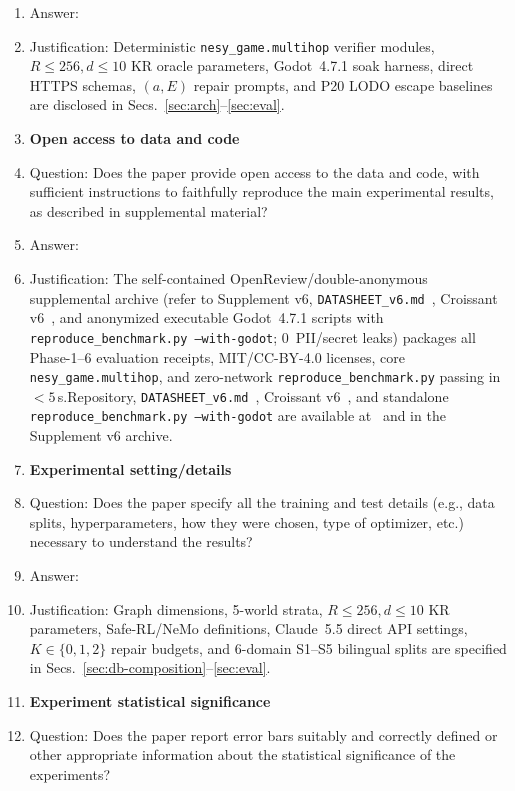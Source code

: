 \documentclass{article}
\begin{document}
\begin{enumerate}
    \item[] Answer: \answerYes{}
    \item[] Justification: Deterministic \texttt{nesy\_game.multihop} verifier modules, $R{\le}256, d{\le}10$ KR oracle parameters, Godot~4.7.1 soak harness, direct HTTPS schemas, $(a,E)$ repair prompts, and P20 LODO escape baselines are disclosed in Secs.~\ref{sec:arch}--\ref{sec:eval}.
\item {\bf Open access to data and code}
    \item[] Question: Does the paper provide open access to the data and code, with sufficient instructions to faithfully reproduce the main experimental results, as described in supplemental material?
    \item[] Answer: \answerYes{}
    \item[] Justification: \ifanonymoussubmission The self-contained OpenReview/double-anonymous supplemental archive (refer to Supplement v6, \texttt{DATASHEET\_v6.md}~\cite{gebru2021datasheets}, Croissant v6~\cite{akhtar2024croissant}, and anonymized executable Godot~4.7.1 scripts with \texttt{reproduce\_benchmark.py --with-godot}; 0~PII/secret leaks) packages all Phase-1--6 evaluation receipts, MIT/CC-BY-4.0 licenses, core \texttt{nesy\_game.multihop}, and zero-network \texttt{reproduce\_benchmark.py} passing in $<5$\,s.\else Repository, \texttt{DATASHEET\_v6.md}~\cite{gebru2021datasheets}, Croissant v6~\cite{akhtar2024croissant}, and standalone \texttt{reproduce\_benchmark.py --with-godot} are available at \RepoURL\ and in the Supplement v6 archive.\fi
\item {\bf Experimental setting/details}
    \item[] Question: Does the paper specify all the training and test details (e.g., data splits, hyperparameters, how they were chosen, type of optimizer, etc.) necessary to understand the results?
    \item[] Answer: \answerYes{}
    \item[] Justification: Graph dimensions, 5-world strata, $R{\le}256, d{\le}10$ KR parameters, Safe-RL/NeMo definitions, Claude~5.5 direct API settings, $K\in\{0,1,2\}$ repair budgets, and 6-domain S1--S5 bilingual splits are specified in Secs.~\ref{sec:db-composition}--\ref{sec:eval}.
\item {\bf Experiment statistical significance}
    \item[] Question: Does the paper report error bars suitably and correctly defined or other appropriate information about the statistical significance of the experiments?

\end{enumerate}
\end{document}
